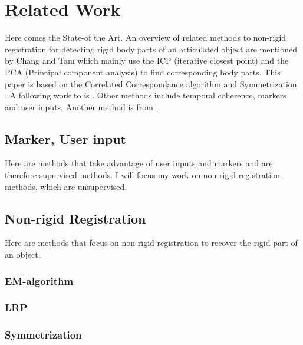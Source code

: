 \chapter{Related Work}
\label{cha:relatedWork}

Here comes the State-of the Art.
An overview of related methods to non-rigid registration for detecting rigid body parts of an articulated object are mentioned by Chang \cite{chang08articulated} and Tam \cite{survey} which mainly use the ICP (iterative closest point) and the PCA (Principal component analysis) to find corresponding body parts. This paper is based on the Correlated Correspondance algorithm \cite{CorrelatedCorrespondance} \cite{Anguelov04} and Symmetrization \cite{Mitra07}. A following work to \cite{chang08articulated} is \cite{chang09range}. Other methods include temporal coherence, markers and user inputs. Another method is from \cite{correspondence}.

\section{Marker, User input}

Here are methods that take advantage of user inputs and markers and are therefore supervised methods. I will focus my work on non-rigid registration methods, which are unsupervised.

\section{Non-rigid Registration}

Here are methods that focus on non-rigid registration to recover the rigid part of an object.

\subsection{EM-algorithm}

\subsection{LRP}

\subsection{Symmetrization}

